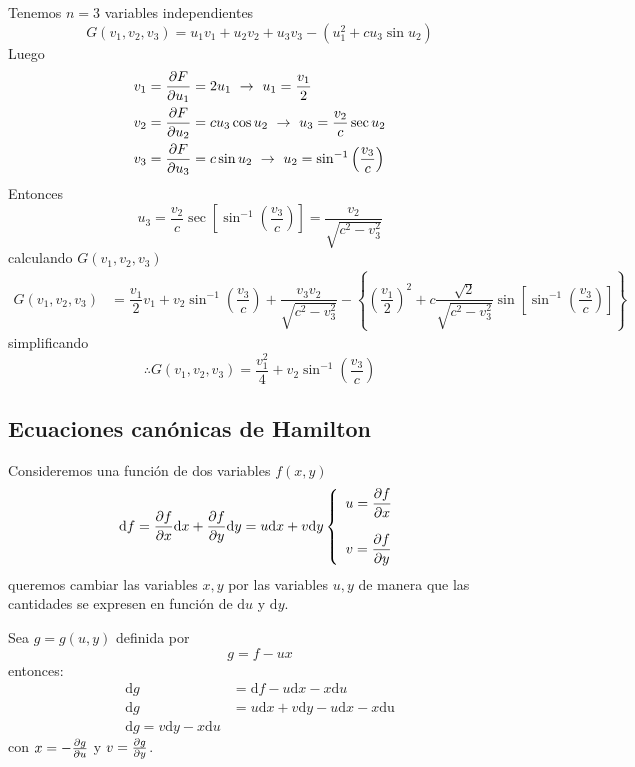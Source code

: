 \documentclass[../main]{subfiles}
\begin{document}
Tenemos $n=3$ variables independientes 
\begin{equation*}
    G(v_1, v_2, v_3)=u_1v_1+u_2v_2+u_3v_3-(u^2_1+cu_3\sin u_2)
\end{equation*}
Luego 
\begin{align*}
    v_1&=\pdv{F}{u_1}=2u_1 \ \rightarrow \ u_1=\dfrac{v_1}{2}\\
    v_2&=\pdv{F}{u_2}=cu_3\cos u_2 \ \rightarrow \ u_3=\dfrac{v_2}{c}\sec u_2\\
    v_3&=\pdv{F}{u_3}=c\sin u_2 \ \rightarrow \ u_2=\sin^{-1} \left(\dfrac{v_3}{c}\right)
\end{align*}
Entonces 
\begin{equation*}
    u_3=\dfrac{v_2}{c}\sec\left[\sin^{-1}\left(\dfrac{v_3}{c}\right)\right]=\dfrac{v_2}{\sqrt{c^2-v^2_3}}
\end{equation*}
calculando $G(v_1, v_2, v_3)$
\begin{align*}
    G(v_1, v_2, v_3)&=\dfrac{v_1}{2}v_1+v_2\sin^{-1}\left(\dfrac{v_3}{c}\right)+\dfrac{v_3 v_2}{\sqrt{c^2-v^2_3}}-\left\{\left(\dfrac{v_1}{2}\right)^2+c\dfrac{\sqrt{2}}{\sqrt{c^2-v^2_3}}\sin\left[\sin^{-1}\left(\dfrac{v_3}{c}\right)\right]\right\}
\end{align*}
simplificando
\begin{equation*}
    \therefore G(v_1, v_2, v_3)=\dfrac{v^2_1}{4}+v_2\sin^{-1}\left(\dfrac{v_3}{c}\right)
\end{equation*}

\subsection{Ecuaciones canónicas de Hamilton}

Consideremos una función de dos variables $f(x, y)$
\begin{equation}
    \mathrm{d}f=\pdv{f}{x}\mathrm{d}x+\pdv{f}{y}\mathrm{d}y=u\mathrm{d}x+v\mathrm{d}y
    \left\{
    \begin{array}{c}
        \displaystyle u=\pdv{f}{x}\\ \\
        \displaystyle v=\pdv{f}{y}
    \end{array}
    \right.
\end{equation}
queremos cambiar las variables $x, y$ por las variables $u, y$ de manera que las cantidades se expresen en función de $\mathrm{d}u$ y $\mathrm{d}y$.

Sea $g=g(u, y)$ definida por 
\begin{equation}
    g=f-ux
\end{equation}
entonces: 
\begin{equation}
    \begin{split}
        \mathrm{d}g&=\mathrm{d}f-u\mathrm{d}x-x\mathrm{d}u \\
        \mathrm{d}g&=u\mathrm{d}x+v\mathrm{d}y-u\mathrm{d}x-x\mathrm{du}\\
        \mathrm{d}g=v\mathrm{d}y-x\mathrm{d}u
    \end{split}
\end{equation}
con $x=-\pdv{g}{u}$ y $v=\pdv{g}{y}$.
\end{document}

